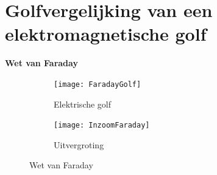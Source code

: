 \documentclass[a4paper,kul]{kulakarticle} %
\begin{document}
\section{Golfvergelijking van een elektromagnetische golf}
\textbf{Wet van Faraday}\\
\begin{figure}[h]
	\centering
	\begin{subfigure}{.5\textwidth}
		\centering
		\texttt{[image: FaradayGolf]}
		\caption[Elektrische golf]{Elektrische golf}
		\label{fig:faradaygolf}
	\end{subfigure}%
	\begin{subfigure}{.5\textwidth}
		\centering
		\texttt{[image: InzoomFaraday]}
		\caption[Inzoom Faraday]{Uitvergroting}
		\label{fig:inzoomfaraday}
	\end{subfigure}
	\caption{Wet van Faraday}
	\label{fig:InductieFaraday}
\end{figure}
\end{document}
